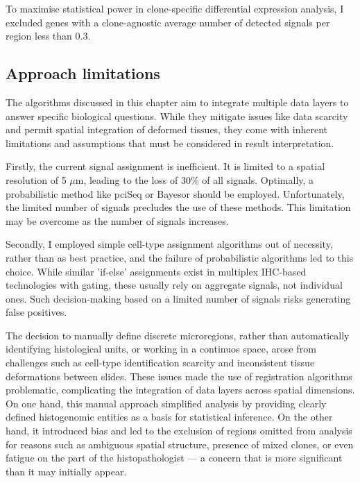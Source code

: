 To maximise statistical power in clone-specific differential expression analysis, I excluded genes with a clone-agnostic average number of detected signals per region less than 0.3.

\subsection{Approach limitations}

The algorithms discussed in this chapter aim to integrate multiple data layers to answer specific biological questions. While they mitigate issues like data scarcity and permit spatial integration of deformed tissues, they come with inherent limitations and assumptions that must be considered in result interpretation.

Firstly, the current signal assignment is inefficient. It is limited to a spatial resolution of 5 $\mu$m, leading to the loss of 30\% of all signals. Optimally, a probabilistic method like pciSeq \parencite{Qian2020-mp} or Bayesor \parencite{Petukhov2022-pv} should be employed. Unfortunately, the limited number of signals precludes the use of these methods. This limitation may be overcome as the number of signals increases.

Secondly, I employed simple cell-type assignment algorithms out of necessity, rather than as best practice, and the failure of probabilistic algorithms led to this choice. While similar 'if-else' assignments exist in multiplex \ac{IHC}-based technologies with gating, these usually rely on aggregate signals, not individual ones. Such decision-making based on a limited number of signals risks generating false positives.

The decision to manually define discrete microregions, rather than automatically identifying histological units, or working in a continuos space, arose from challenges such as cell-type identification scarcity and inconsistent tissue deformations between slides. These issues made the use of registration algorithms problematic, complicating the integration of data layers across spatial dimensions. On one hand, this manual approach simplified analysis by providing clearly defined histogenomic entities as a basis for statistical inference. On the other hand, it introduced bias and led to the exclusion of regions omitted from analysis for reasons such as ambiguous spatial structure, presence of mixed clones, or even fatigue on the part of the histopathologist — a concern that is more significant than it may initially appear.

